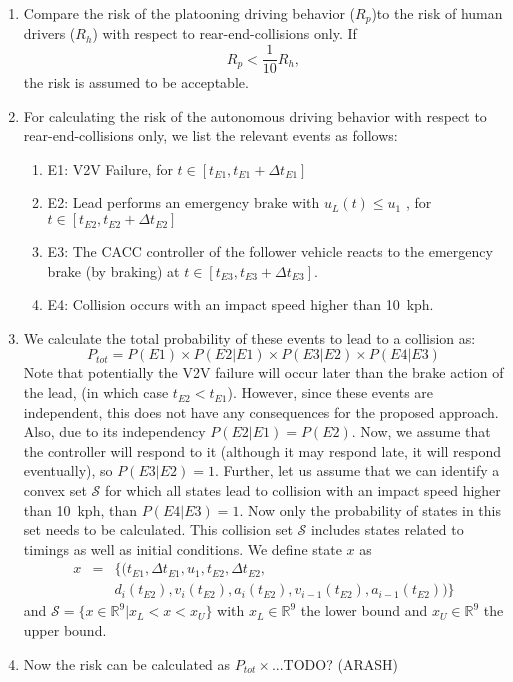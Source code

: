 \begin{enumerate}
\item{Compare the risk of the platooning driving behavior ($R_p$)to the risk of human drivers ($R_h$) with respect to rear-end-collisions only. If $$R_p < \frac{1}{10} R_h, $$ the risk is assumed to be acceptable.}
\item{For calculating the risk of the autonomous driving behavior with respect to rear-end-collisions only, we list the relevant events as follows:
\begin{enumerate}
\item{E1: V2V Failure, for $t\in[t_{E1}, t_{E1}+\Delta t_{E1}]$}
\item{E2: Lead performs an emergency brake with $u_{L}(t)\leq u_1$ , for $t\in[t_{E2}, t_{E2}+\Delta t_{E2}]$}
\item{E3: The CACC controller of the follower vehicle reacts to the emergency brake (by braking) at $t\in[t_{E3}, t_{E3}+\Delta t_{E3}]$.}
\item{E4: Collision occurs with an impact speed higher than 10~kph.}
\end{enumerate}
}
\item{We calculate the total probability of these events to lead to a collision as:
\begin{equation}
P_{tot} = P(E1) \times P(E2|E1) \times P(E3|E2) \times P(E4|E3)
\end{equation}
Note that potentially the V2V failure will occur later than the brake action of the lead, (in which case $t_{E2}<t_{E1}$). However, since these events are independent, this does not have any consequences for the proposed approach. Also, due to its independency $ P(E2|E1)=P(E2)$.
Now, we assume that the controller will respond to it (although it may respond late, it will respond eventually), so $P(E3|E2)=1$. Further, let us assume that we can identify a convex set $\mathcal{S}$ for which all states lead to collision with an impact speed higher than 10~kph, than $P(E4|E3)=1$.  Now only the probability of states in this set needs to be calculated.
This collision set $\mathcal{S}$ includes states related to timings as well as initial conditions. We define state $x$ as
\begin{eqnarray*}
x&=&\{(t_{E1},\Delta t_{E1},u_{1},t_{E2},\Delta t_{E2},\\
&&d_i(t_{E2}),v_i(t_{E2}),a_i(t_{E2}), v_{i-1}(t_{E2}),a_{i-1}(t_{E2})) \}
\end{eqnarray*}
and $\mathcal{S} = \{x \in \mathbb{R}^9|x_L < x < x_U\}$ with $x_L \in \mathbb{R}^9$ the lower bound and $x_U \in \mathbb{R}^9$ the upper bound. }
\item{Now the risk can be calculated as $P_{tot} \times $...TODO? (ARASH)}
\end{enumerate}
